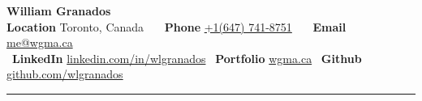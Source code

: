 \documentclass[10pt,letterpaper]{article}
\begin{document}
	
	\begin{center}
		{\LARGE \textbf{William Granados}}
		\ \vspace{0.2em}
		\ \\ \textbf{Location} Toronto, Canada\ \ \textbullet
		\ \textbf{Phone} \href{tel:16477418751}{+1(647) 741-8751}\ \ \textbullet
		\ \textbf{Email}  \href{mailto:me@wgma.ca}{me@wgma.ca}
		\  %
		\\ \ \textbf{LinkedIn} \href{https://linkedin.com/in/wlgranados}{linkedin.com/in/wlgranados} \textbullet
		\ \textbf{Portfolio} \href{https://wgma.ca}{wgma.ca} \textbullet
		\ \textbf{Github} \href{https://github.com/wlgranados}{github.com/wlgranados}
		\ 
	\end{center}
	
	\vspace{-0.3em}
	\hrule
	\vspace{-0.4em}
	\bigskip
	
\end{document}
